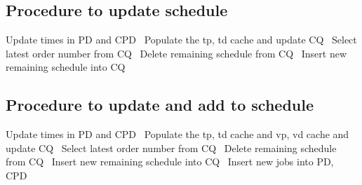 \subsection{Procedure to update schedule}
\nwenddocs{}\endmoddef{}
\LA{}Update times in PD and CPD~{\nwtagstyle{}}\RA{}
\LA{}Populate the tp, td cache and update CQ~{\nwtagstyle{}}\RA{}
\LA{}Select latest order number from CQ~{\nwtagstyle{}}\RA{}
\LA{}Delete remaining schedule from CQ~{\nwtagstyle{}}\RA{}
\LA{}Insert new remaining schedule into CQ~{\nwtagstyle{}}\RA{}
\nwendcode{}\nwdocspar

\subsection{Procedure to update and add to schedule}
\nwenddocs{}\endmoddef{}
\LA{}Update times in PD and CPD~{\nwtagstyle{}}\RA{}
\LA{}Populate the tp, td cache and vp, vd cache and update CQ~{\nwtagstyle{}}\RA{}
\LA{}Select latest order number from CQ~{\nwtagstyle{}}\RA{}
\LA{}Delete remaining schedule from CQ~{\nwtagstyle{}}\RA{}
\LA{}Insert new remaining schedule into CQ~{\nwtagstyle{}}\RA{}
\LA{}Insert new jobs into PD, CPD~{\nwtagstyle{}}\RA{}
\nwendcode{}\nwdocspar

